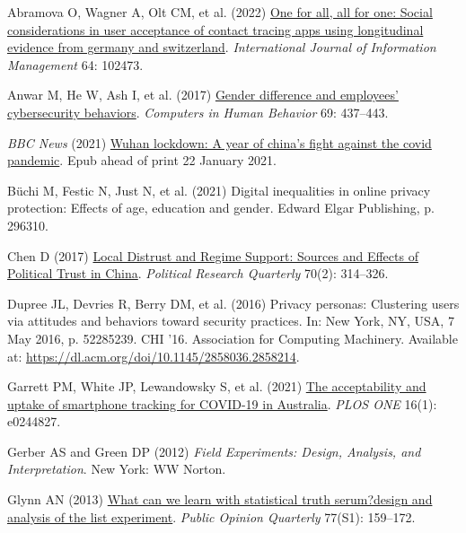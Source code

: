 \documentclass[
  letterpaper,
  DIV=11,
  numbers=noendperiod]{scrartcl}
\newlength{\cslhangindent}
\newenvironment{CSLReferences}[2] %
 {\begin{list}{}{%
  \setlength{\itemindent}{0pt}
  \setlength{\leftmargin}{0pt}
  \setlength{\parsep}{0pt}
  \ifodd #1
   \setlength{\leftmargin}{\cslhangindent}
   \setlength{\itemindent}{-1\cslhangindent}
  \fi
  \setlength{\itemsep}{#2\baselineskip}}}
 {\end{list}}
\begin{document}
\label{refs}
\begin{CSLReferences}{1}{1}
Abramova O, Wagner A, Olt CM, et al. (2022)
\href{https://doi.org/10.1016/j.ijinfomgt.2022.102473}{One for all, all
for one: Social considerations in user acceptance of contact tracing
apps using longitudinal evidence from germany and switzerland}.
\emph{International Journal of Information Management} 64: 102473.

Anwar M, He W, Ash I, et al. (2017)
\href{https://doi.org/10.1016/j.chb.2016.12.040}{Gender difference and
employees' cybersecurity behaviors}. \emph{Computers in Human Behavior}
69: 437--443.

\emph{BBC News} (2021)
\href{https://www.bbc.com/news/world-asia-china-55628488}{Wuhan
lockdown: A year of china's fight against the covid pandemic}. Epub
ahead of print 22 January 2021.

Büchi M, Festic N, Just N, et al. (2021) Digital inequalities in online
privacy protection: Effects of age, education and gender. Edward Elgar
Publishing, p. 296310.

Chen D (2017) \href{https://doi.org/10.1177/1065912917691360}{Local
Distrust and Regime Support: Sources and Effects of Political Trust in
China}. \emph{Political Research Quarterly} 70(2): 314--326.

Dupree JL, Devries R, Berry DM, et al. (2016) Privacy personas:
Clustering users via attitudes and behaviors toward security practices.
In: New York, NY, USA, 7 May 2016, p. 52285239. CHI '16. Association for
Computing Machinery. Available at:
\url{https://dl.acm.org/doi/10.1145/2858036.2858214}.

Garrett PM, White JP, Lewandowsky S, et al. (2021)
\href{https://doi.org/10.1371/journal.pone.0244827}{The acceptability
and uptake of smartphone tracking for COVID-19 in Australia}. \emph{PLOS
ONE} 16(1): e0244827.

Gerber AS and Green DP (2012) \emph{Field Experiments: Design, Analysis,
and Interpretation}. New York: WW Norton.

Glynn AN (2013) \href{https://doi.org/10.1093/poq/nfs070}{What can we
learn with statistical truth serum?design and analysis of the list
experiment}. \emph{Public Opinion Quarterly} 77(S1): 159--172.


\end{CSLReferences}
\end{document}

